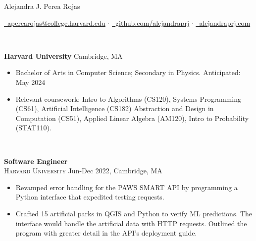 \documentclass[11pt]{article}
\begin{document}
  \centerline{\Large{Alejandra J. Perea Rojas}}\vspace{1mm}

  \centerline{
    \href{mailto:aperearojas@college.harvard.edu}{\faEnvelopeO~aperearojas@college.harvard.edu} 
    $\cdot$ \href{https://github.com/alejandraprj}{\faGithub~github.com/alejandraprj}
    $\cdot$ \href{https://alejandraprj.com}{\faGlobe~alejandraprj.com}
  }\vspace{2mm}

  \vspace{-7pt}\\
  \noindent\makebox[\linewidth]{\rule{7.5in}{0.3pt}}

  \noindent \textbf{Harvard University} \hfill Cambridge, MA
    \begin{itemize}[itemsep=-.4em, leftmargin=1em]\vspace{-2mm}
        \item Bachelor of Arts in Computer Science; Secondary in Physics. \hfill Anticipated: May 2024
        \item Relevant coursework: Intro to Algorithms (CS120), 
                  Systems Programming (CS61), Artificial Intelligence (CS182)
                  Abstraction and Design in Computation (CS51), 
                  Applied Linear Algebra (AM120), 
                  Intro to Probability (STAT110). %
    \end{itemize}

  \vspace{-7pt}\\
  \noindent\makebox[\linewidth]{\rule{7.5in}{0.3pt}}

    \noindent \textbf{Software Engineer}\\
    \textsc{Harvard University} \hfill Jun-Dec 2022, Cambridge, MA
    \begin{itemize}[itemsep=-.4em, leftmargin=1em]\vspace{-2mm}
      \item Revamped error handling for the PAWS SMART API by programming a Python interface that expedited testing requests. 
      \item Crafted 15 artificial parks in QGIS and Python to verify ML predictions. The interface would handle the artificial data with HTTP requests. Outlined the program with greater detail in the API's deployment guide.
    \end{itemize}
    
\end{document}
